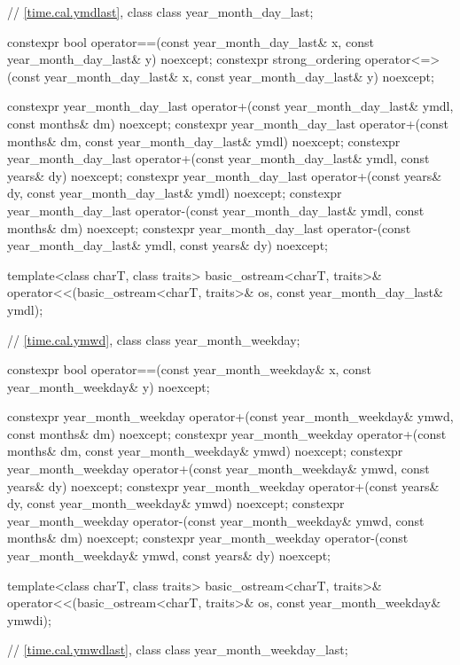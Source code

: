\begin{codeblock}
{  // \ref{time.cal.ymdlast}, class 
  class year_month_day_last;

  constexpr bool operator==(const year_month_day_last& x,
                            const year_month_day_last& y) noexcept;
  constexpr strong_ordering operator<=>(const year_month_day_last& x,
                                        const year_month_day_last& y) noexcept;

  constexpr year_month_day_last
    operator+(const year_month_day_last& ymdl, const months& dm) noexcept;
  constexpr year_month_day_last
    operator+(const months& dm, const year_month_day_last& ymdl) noexcept;
  constexpr year_month_day_last
    operator+(const year_month_day_last& ymdl, const years& dy) noexcept;
  constexpr year_month_day_last
    operator+(const years& dy, const year_month_day_last& ymdl) noexcept;
  constexpr year_month_day_last
    operator-(const year_month_day_last& ymdl, const months& dm) noexcept;
  constexpr year_month_day_last
    operator-(const year_month_day_last& ymdl, const years& dy) noexcept;

  template<class charT, class traits>
    basic_ostream<charT, traits>&
      operator<<(basic_ostream<charT, traits>& os, const year_month_day_last& ymdl);

  // \ref{time.cal.ymwd}, class 
  class year_month_weekday;

  constexpr bool operator==(const year_month_weekday& x,
                            const year_month_weekday& y) noexcept;

  constexpr year_month_weekday
    operator+(const year_month_weekday& ymwd, const months& dm) noexcept;
  constexpr year_month_weekday
    operator+(const months& dm, const year_month_weekday& ymwd) noexcept;
  constexpr year_month_weekday
    operator+(const year_month_weekday& ymwd, const years& dy) noexcept;
  constexpr year_month_weekday
    operator+(const years& dy, const year_month_weekday& ymwd) noexcept;
  constexpr year_month_weekday
    operator-(const year_month_weekday& ymwd, const months& dm) noexcept;
  constexpr year_month_weekday
    operator-(const year_month_weekday& ymwd, const years& dy) noexcept;

  template<class charT, class traits>
    basic_ostream<charT, traits>&
      operator<<(basic_ostream<charT, traits>& os, const year_month_weekday& ymwdi);

  // \ref{time.cal.ymwdlast}, class 
  class year_month_weekday_last;

}
\end{codeblock}
